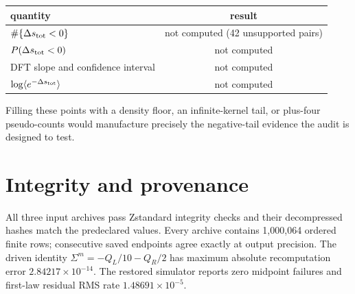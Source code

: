 \documentclass[11pt]{article}
\begin{document}
\begin{center}
\begin{tabular}{lc}
\toprule
quantity & result\\
\midrule
$\#\{\Delta s_{\rm tot}<0\}$ & not computed (42 unsupported pairs)\\
$P(\Delta s_{\rm tot}<0)$ & not computed\\
DFT slope and confidence interval & not computed\\
$\log\langle e^{-\Delta s_{\rm tot}}\rangle$ & not computed\\
\bottomrule
\end{tabular}
\end{center}

Filling these points with a density floor, an infinite-kernel tail, or
plus-four pseudo-counts would manufacture precisely the negative-tail evidence
the audit is designed to test.

\section{Integrity and provenance}

All three input archives pass Zstandard integrity checks and their
decompressed hashes match the predeclared values.  Every archive contains
1,000,064 ordered finite rows; consecutive saved endpoints agree exactly at
output precision.  The driven identity
$\Sigma^m=-Q_L/10-Q_R/2$ has maximum absolute recomputation error
$2.84217\times10^{-14}$.  The restored simulator reports zero midpoint
failures and first-law residual RMS rate $1.48691\times10^{-5}$.

\end{document}
